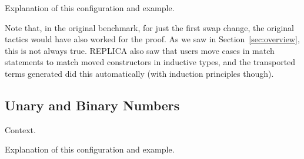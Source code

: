 Explanation of this configuration and example.

Note that, in the original benchmark, for just the first swap change,
the original tactics would have also worked for the proof. 
As we saw in Section~\ref{sec:overview}, this is not always true.
REPLICA also saw that users move cases in match statements to match moved constructors
in inductive types, and the transported terms \toolname generated did this automatically
(with induction principles though).

\subsection{Unary and Binary Numbers}
\label{sec:bin}

Context.

Explanation of this configuration and example.








